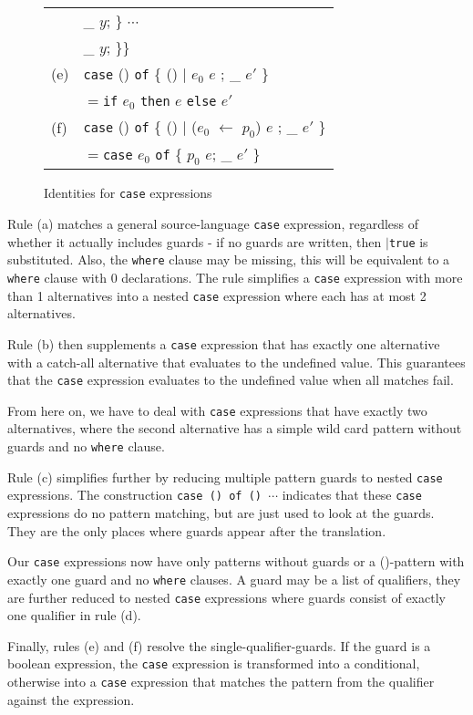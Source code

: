 \begin{figure}[hbt]
{\begin{tabular}{ll}
&\hspace{7.0cm}\_ \arrow{} $y$; \} $\cdots$ \\
&\hspace{2.0cm}\_ \arrow{} $y$; \}\}\\
(e) &\texttt{case} () \texttt{of} \{ () $|$ $e_0$ \arrow{} $e$  ; \_ \arrow{} $e'$ \}\\
&$=$\texttt{if} $e_0$ \texttt{then} $e$ \texttt{else} $e'$\\
(f) &\texttt{case} () \texttt{of} \{ () $|$ ($e_0$ $\leftarrow$ $p_0$) \arrow{} $e$  ; \_ \arrow{} $e'$ \}\\
&$=$\texttt{case} $e_0$ \texttt{of} \{ $p_0$ \arrow{} $e$; \_ \arrow{} $e'$ \}\\
\end{tabular}
}
\caption{Identities for \texttt{case} expressions}
\label{formalcase}
\end{figure}

Rule (a) matches a general source-language \texttt{case} expression, regardless of whether it actually includes guards - if no guards are written, then \texttt{$|$true} is substituted. Also, the \texttt{where} clause may be missing, this will be equivalent to a \texttt{where} clause with 0 declarations. The rule simplifies a \texttt{case} expression with more than 1 alternatives into a nested \texttt{case} expression where each has at most 2 alternatives.

Rule (b) then supplements a \texttt{case} expression that has exactly one alternative with a catch-all alternative that evaluates to the undefined value. This guarantees that the  \texttt{case} expression evaluates to the undefined value when all matches fail.

From here on, we have to deal with \texttt{case} expressions that have exactly two alternatives, where the second alternative has a simple wild card pattern without guards and no \texttt{where} clause.

Rule (c) simplifies further by reducing multiple pattern guards to nested  \texttt{case} expressions. The construction \texttt{case () of () \arrow{} $\cdots$} indicates that these  \texttt{case} expressions do no pattern matching, but are just used to look at the guards. They are the only places where guards appear after the translation.

Our  \texttt{case} expressions now have only patterns without guards or a ()-pattern with exactly one guard and no \texttt{where} clauses. A guard may be a list of qualifiers, they are further reduced to nested  \texttt{case} expressions where guards consist of exactly one qualifier in rule (d).

Finally, rules (e) and (f) resolve the single-qualifier-guards. If the guard is a boolean expression, the \texttt{case} expression is transformed into a conditional, otherwise into a \texttt{case} expression that matches the pattern from the qualifier against the expression.
